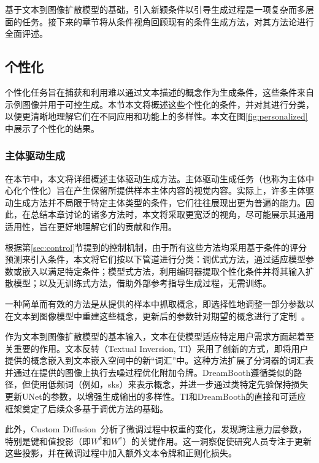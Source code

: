 基于文本到图像扩散模型的基础，引入新颖条件以引导生成过程是一项复杂而多层面的任务。接下来的章节将从条件视角回顾现有的条件生成方法，对其方法论进行全面评述。

\subsection{个性化}
\label{sec:personalization}
个性化任务旨在捕获和利用难以通过文本描述的概念作为生成条件，这些条件来自示例图像并用于可控生成。本节本文将概述这些个性化的条件，并对其进行分类，以便更清晰地理解它们在不同应用和功能上的多样性。本文在图\ref{fig:personalized}中展示了个性化的结果。

\subsubsection{主体驱动生成}
\label{sec:subject}
在本节中，本文将详细概述主体驱动生成方法。主体驱动生成任务（也称为主体中心化个性化）旨在产生保留所提供样本主体内容的视觉内容。实际上，许多主体驱动生成方法并不局限于特定主体类型的条件，它们往往展现出更为普遍的能力。因此，在总结本章讨论的诸多方法时，本文将采取更宽泛的视角，尽可能展示其通用适用性，旨在更好地理解它们的贡献和作用。

根据第\ref{sec:control}节提到的控制机制，由于所有这些方法均采用基于条件的评分预测来引入条件，本文将它们按以下管道进行分类：调优式方法，通过适应模型参数或嵌入以满足特定条件；模型式方法，利用编码器提取个性化条件并将其输入扩散模型；以及无训练式方法，借助外部参考指导生成过程，无需训练。

一种简单而有效的方法是从提供的样本中抓取概念，即选择性地调整一部分参数以在文本到图像模型中重建这些概念，更新后的参数针对期望的概念进行了定制~\cite{dong2022dreamartist,gal2022image,ruiz2023dreambooth,voynov2023p+,zhang2023prospect,roy2023diffnat,zhao2023videoassembler}。

作为文本到图像扩散模型的基本输入，文本在使模型适应特定用户需求方面起着至关重要的作用。文本反转（Textual Inversion, TI）\cite{gal2022image}采用了创新的方式，即将用户提供的概念嵌入到文本嵌入空间中的新“词汇”中。这种方法扩展了分词器的词汇表并通过在提供的图像上执行去噪过程优化附加令牌。DreamBooth\cite{ruiz2023dreambooth}遵循类似的路径，但使用低频词（例如，sks）来表示概念，并进一步通过类特定先验保持损失更新UNet的参数，以增强生成输出的多样性。TI和DreamBooth的直接和可适应框架奠定了后续众多基于调优方法的基础。

此外，Custom Diffusion~\cite{kumari2023multi}分析了微调过程中权重的变化，发现跨注意力层参数，特别是键和值投影（即$W^k$和$W^v$）的关键作用。这一洞察促使研究人员专注于更新这些投影，并在微调过程中加入额外文本令牌和正则化损失。


